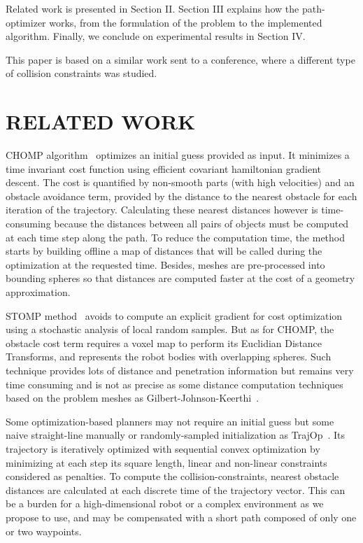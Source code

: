 \documentclass{tADR2e}
\begin{document}
Related work is presented in Section II. Section III explains how the 
path-optimizer works, from the formulation of the problem to the implemented
algorithm. Finally, we conclude on experimental results in Section IV.

This paper is based on a similar work sent to a conference, where a different type of collision constraints was studied.


\section{RELATED WORK}

CHOMP algorithm~\cite{RatliffChomp} optimizes an initial guess provided as
input. It minimizes a time invariant cost function using efficient covariant
hamiltonian gradient descent. The cost is quantified by non-smooth parts (with
high velocities) and an obstacle avoidance term, provided by the distance to the 
nearest obstacle for each iteration of the trajectory. Calculating these nearest 
distances however is time-consuming because the distances between all pairs of 
objects must be computed at each time step along the path. To reduce the 
computation time, the method starts by building offline a map of distances that 
will be called during the optimization at the requested time. Besides, meshes 
are pre-processed into bounding spheres so that distances are computed faster 
at the cost of a geometry approximation.

STOMP method~\cite{KalakrishnanStomp} avoids to compute an 
explicit gradient for cost optimization using a stochastic analysis of local 
random samples. But as for CHOMP, the obstacle cost term requires a voxel map to 
perform its Euclidian Distance Transforms, and represents the robot bodies with 
overlapping spheres. Such technique provides lots of distance and penetration 
information but remains very time consuming and is not as precise as some 
distance computation techniques based on the problem meshes as 
Gilbert-Johnson-Keerthi~\cite{gilbertGjk}.

Some optimization-based planners may not require an initial guess but some naive 
straight-line manually or randomly-sampled initialization as 
TrajOp~\cite{SchulmanConvexOptim}. Its trajectory is iteratively optimized with 
sequential convex optimization by minimizing at each step its square length, 
linear and non-linear constraints considered as penalties. To compute the 
collision-constraints, nearest obstacle distances are calculated at each discrete 
time of the trajectory vector. This can be a burden for a high-dimensional robot 
or a complex environment as we propose to use, and may be compensated with a 
short path composed of only one or two waypoints.
\end{document}
